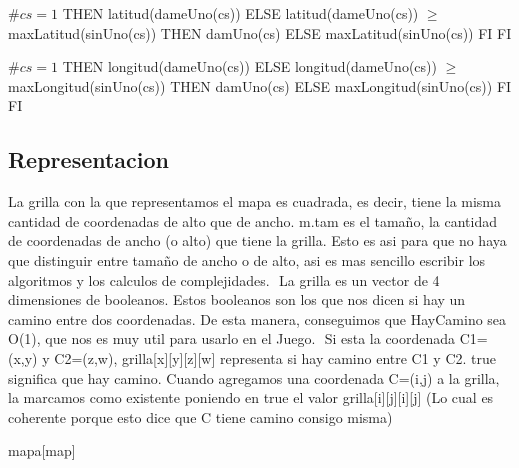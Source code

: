 \begin{Interfaz}
\begin{tad}{}

{
\IF
$\#cs = 1$
THEN
latitud(dameUno(cs))
ELSE
{
\IF latitud(dameUno(cs)) $\geq$ maxLatitud(sinUno(cs))
THEN
damUno(cs)
ELSE
maxLatitud(sinUno(cs))
FI
}
FI}


{
\IF
$\#cs = 1$
THEN
longitud(dameUno(cs))
ELSE
{
\IF longitud(dameUno(cs)) $\geq$ maxLongitud(sinUno(cs))
THEN
damUno(cs)
ELSE
maxLongitud(sinUno(cs))
FI
}
FI}


\end{tad}



\end{Interfaz}


\begin{Representacion}
\subsection{Representacion}

La grilla con la que representamos el mapa es cuadrada, es decir, tiene la misma cantidad de coordenadas de alto que de ancho. m.tam es el tama\~no, la cantidad de coordenadas de ancho (o alto) que tiene la grilla. Esto es asi para que no haya que distinguir entre tama\~no de ancho o de alto, asi es mas sencillo escribir los algoritmos y los calculos de complejidades.
$ $\newline
La grilla es un vector de 4 dimensiones de booleanos. Estos booleanos son los que nos dicen si hay un camino entre dos coordenadas. De esta manera, conseguimos que HayCamino sea O(1), que nos es muy util para usarlo en el Juego.
$ $\newline
Si esta la coordenada C1=(x,y) y C2=(z,w), grilla[x][y][z][w] representa si hay camino entre C1 y C2. true significa que hay camino. Cuando agregamos una coordenada C=(i,j) a la grilla, la marcamos como existente poniendo en true el valor grilla[i][j][i][j] (Lo cual es coherente porque esto dice que C tiene camino consigo misma)

\begin{Estructura}{mapa}[map]
	\begin{Tupla}[map]  
  	\end{Tupla}
  	
\end{Estructura}



\end{Representacion}
